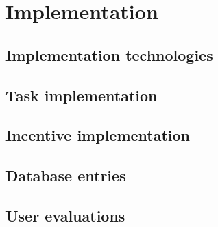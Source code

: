 \section{Implementation}


\subsection{Implementation technologies}



\subsection{Task implementation}
\subsection{Incentive implementation}
\subsection{Database entries}
\subsection{User evaluations}